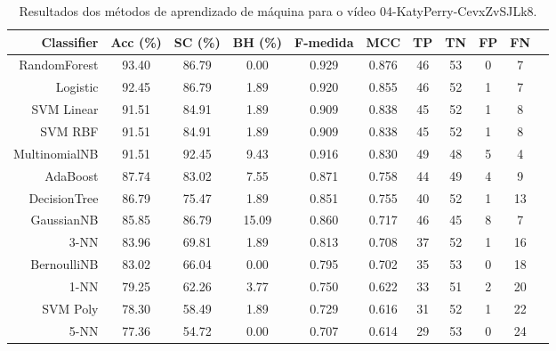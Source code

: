 \begin{table}[!htb]
\centering
\caption{Resultados dos métodos de aprendizado de máquina para o vídeo 04-KatyPerry-CevxZvSJLk8.}
\label{tab:04-KatyPerry-CevxZvSJLk8}
\begin{tabular}{r|c|c|c|c|c|c|c|c|c|c}
\hline\hline
Classifier & Acc (\%) & SC (\%) & BH (\%) & F-medida & MCC & TP & TN & FP & FN \\ \hline
RandomForest & 93.40 & 86.79 & 0.00 & 0.929 & 0.876 & 46 & 53 & 0 & 7 \\ 
Logistic & 92.45 & 86.79 & 1.89 & 0.920 & 0.855 & 46 & 52 & 1 & 7 \\ 
SVM Linear & 91.51 & 84.91 & 1.89 & 0.909 & 0.838 & 45 & 52 & 1 & 8 \\ 
SVM RBF & 91.51 & 84.91 & 1.89 & 0.909 & 0.838 & 45 & 52 & 1 & 8 \\ 
MultinomialNB & 91.51 & 92.45 & 9.43 & 0.916 & 0.830 & 49 & 48 & 5 & 4 \\ 
AdaBoost & 87.74 & 83.02 & 7.55 & 0.871 & 0.758 & 44 & 49 & 4 & 9 \\ 
DecisionTree & 86.79 & 75.47 & 1.89 & 0.851 & 0.755 & 40 & 52 & 1 & 13 \\ 
GaussianNB & 85.85 & 86.79 & 15.09 & 0.860 & 0.717 & 46 & 45 & 8 & 7 \\ 
3-NN & 83.96 & 69.81 & 1.89 & 0.813 & 0.708 & 37 & 52 & 1 & 16 \\ 
BernoulliNB & 83.02 & 66.04 & 0.00 & 0.795 & 0.702 & 35 & 53 & 0 & 18 \\ 
1-NN & 79.25 & 62.26 & 3.77 & 0.750 & 0.622 & 33 & 51 & 2 & 20 \\ 
SVM Poly & 78.30 & 58.49 & 1.89 & 0.729 & 0.616 & 31 & 52 & 1 & 22 \\ 
5-NN & 77.36 & 54.72 & 0.00 & 0.707 & 0.614 & 29 & 53 & 0 & 24 \\ 
\hline\hline
\end{tabular}
\end{table}
